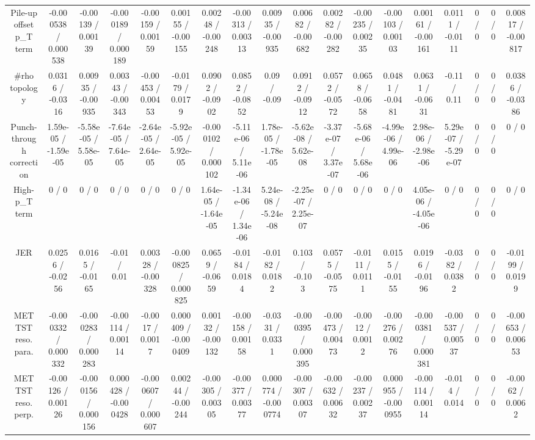 \documentclass[10pt]{article}
\begin{document}
\begin{table}[htbp]
\begin{center}
\begin{tabular}{|c|c|c|c|c|c|c|c|c|c|c|c|c|c|c|c|c|c|}
  Pile-up offset p_{T} term & -0.000538 / 0.000538 & -0.00139 / 0.00139 & -0.000189 / 0.000189 & -0.00159 / 0.00159 & 0.00155 / -0.00155 & 0.00248 / -0.00248 & -0.00313 / 0.00313 & 0.00935 / -0.00935 & 0.00682 / -0.00682 & 0.00282 / -0.00282 & -0.00235 / 0.00235 & -0.00103 / 0.00103 & 0.00161 / -0.00161 & 0.0111 / -0.0111 & 0 / 0 & 0 / 0 & 0.00817 / -0.00817 \\ 
  #rho topology & 0.0316 / -0.0316 & 0.00935 / -0.00935 & 0.00343 / -0.00343 & -0.00453 / 0.00453 & -0.0179 / 0.0179 & 0.0902 / -0.0902 & 0.0852 / -0.0852 & 0.09 / -0.09 & 0.0912 / -0.0912 & 0.0572 / -0.0572 & 0.0658 / -0.0658 & 0.0481 / -0.0481 & 0.0631 / -0.0631 & -0.11 / 0.11 & 0 / 0 & 0 / 0 & 0.0386 / -0.0386 \\ 
  Punch-through correction & 1.59e-05 / -1.59e-05 & -5.58e-05 / 5.58e-05 & -7.64e-05 / 7.64e-05 & -2.64e-05 / 2.64e-05 & -5.92e-05 / 5.92e-05 & -0.000102 / 0.000102 & -5.11e-06 / 5.11e-06 & 1.78e-05 / -1.78e-05 & -5.62e-08 / 5.62e-08 & -3.37e-07 / 3.37e-07 & -5.68e-06 / 5.68e-06 & -4.99e-06 / 4.99e-06 & 2.98e-06 / -2.98e-06 & 5.29e-07 / -5.29e-07 & 0 / 0 & 0 / 0 & 0 / 0 \\ 
  High-p_{T} term & 0 / 0 & 0 / 0 & 0 / 0 & 0 / 0 & 0 / 0 & 1.64e-05 / -1.64e-05 & -1.34e-06 / 1.34e-06 & 5.24e-08 / -5.24e-08 & -2.25e-07 / 2.25e-07 & 0 / 0 & 0 / 0 & 0 / 0 & 4.05e-06 / -4.05e-06 & 0 / 0 & 0 / 0 & 0 / 0 & 0 / 0 \\ 
  JER & 0.0256 / -0.0256 & 0.0165 / -0.0165 & -0.01 / 0.01 & 0.00328 / -0.00328 & -0.000825 / 0.000825 & 0.0659 / -0.0659 & -0.0184 / 0.0184 & -0.0182 / 0.0182 & 0.103 / -0.103 & 0.0575 / -0.0575 & -0.0111 / 0.0111 & 0.0155 / -0.0155 & 0.0196 / -0.0196 & -0.0382 / 0.0382 & 0 / 0 & 0 / 0 & -0.0199 / 0.0199 \\ 
  MET TST reso. para. & -0.000332 / 0.000332 & -0.000283 / 0.000283 & -0.00114 / 0.00114 & -0.0017 / 0.0017 & 0.000409 / -0.000409 & 0.00132 / -0.00132 & -0.00158 / 0.00158 & -0.0331 / 0.0331 & -0.000395 / 0.000395 & -0.00473 / 0.00473 & -0.0012 / 0.0012 & -0.00276 / 0.00276 & -0.000381 / 0.000381 & -0.00537 / 0.00537 & 0 / 0 & 0 / 0 & -0.00653 / 0.00653 \\ 
  MET TST reso. perp. & -0.00126 / 0.00126 & -0.000156 / 0.000156 & 0.000428 / -0.000428 & -0.000607 / 0.000607 & 0.00244 / -0.00244 & -0.00305 / 0.00305 & -0.00377 / 0.00377 & 0.000774 / -0.000774 & -0.00307 / 0.00307 & -0.00632 / 0.00632 & -0.00237 / 0.00237 & 0.000955 / -0.000955 & -0.00114 / 0.00114 & -0.014 / 0.014 & 0 / 0 & 0 / 0 & -0.0062 / 0.0062 \\ 

\end{tabular}
\end{center}
\end{table}
\end{document}

